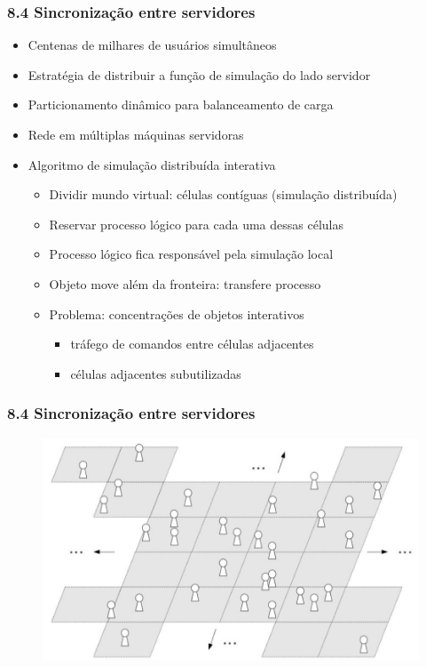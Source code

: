 \documentclass{beamer}
\begin{document}
\begin{frame}
  \frametitle{8.4 Sincronização entre servidores}
  \begin{itemize}
    \item Centenas de milhares de usuários simultâneos
    \item Estratégia de distribuir a função de simulação do lado servidor
    \item Particionamento dinâmico para balanceamento de carga
    \item Rede em múltiplas máquinas servidoras
    \item Algoritmo de simulação distribuída interativa
    \begin{itemize}
      \item Dividir mundo virtual: células contíguas (simulação distribuída)
      \item Reservar processo lógico para cada uma dessas células
      \item Processo lógico fica responsável pela simulação local
      \item Objeto move além da fronteira: transfere processo
      \item Problema: concentrações de objetos interativos
      \begin{itemize}
        \item tráfego de comandos entre células  adjacentes
        \item células adjacentes subutilizadas
      \end{itemize}
    \end{itemize}
  \end{itemize}
\end{frame}

\begin{frame}
  \frametitle{8.4 Sincronização entre servidores}
  \begin{figure}[h]
    \centering
    \vspace{-18pt}
    \includegraphics[width=1.03\textwidth]{imagem_84.png}
    \vspace{-20pt}
  \end{figure}
\end{frame}
\end{document}
